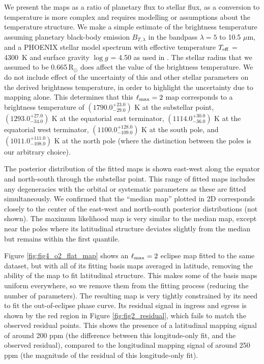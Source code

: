 \documentclass[twocolumn]{aastex631}
\begin{document}
We present the maps as a ratio of planetary flux to stellar flux, as a conversion to temperature is more complex and requires modelling or assumptions about the temperature structure. We make a simple estimate of the brightness temperature assuming planetary black-body emission $B_{T,\lambda}$ in the bandpass $\lambda=5$ to 10.5 $\mu$m, and a PHOENIX \citep{allard1995, hauschildt1999, husser2013} stellar model spectrum with effective temperature $T_{\rm eff}$ = 4300~K and surface gravity $\log g$ = 4.50 as used in \citet{bell2023wasp43b}. The stellar radius that we assumed to be 0.665\,R$_{\odot}$ does affect the value of the brightness temperature. We do not include effect of the uncertainty of this and other stellar parameters on the derived brightness temperature, in order to highlight the uncertainty due to mapping alone. This determines that this $\ell_{\rm max}=2$ map corresponds to a brightness temperature of $( 1790.0 ^{+ 23.0 } _{- 29.0 }) $ K at the substellar point, $( 1293.0 ^{+ 27.0 } _{- 34.0 }) $ K at the equatorial east terminator, $( 1114.0 ^{+ 30.0 } _{- 36.0 }) $ K at the equatorial west terminator, $( 1100.0 ^{+ 128.0 } _{- 109.0 }) $ K at the south pole, and $( 1011.0 ^{+ 111.0 } _{- 108.0 }) $ K at the north pole (where the distinction between the poles is our arbitrary choice).

The posterior distribution of the fitted maps is shown east-west along the equator and north-south through the substellar point. This range of fitted maps includes any degeneracies with the orbital or systematic parameters as these are fitted simultaneously. We confirmed that the ``median map'' plotted in 2D corresponds closely to the center of the east-west and north-south posterior distributions (not shown). The maximum likelihood map is very similar to the median map, except near the poles where its latitudinal structure deviates slightly from the median but remains within the first quantile.

Figure \ref{fig:fig4_o2_flat_map} shows an $\ell_{\rm max}=2$ eclipse map fitted to the same dataset, but with all of its fitting basis maps averaged in latitude, removing the ability of the map to fit latitudinal structure. This makes some of the basis maps uniform everywhere, so we remove them from the fitting process (reducing the number of parameters). The resulting map is very tightly constrained by its need to fit the out-of-eclipse phase curve. Its residual signal in ingress and egress is shown by the red region in Figure \ref{fig:fig2_residual}, which fails to match the observed residual points. This shows the presence of a latitudinal mapping signal of around 200 ppm (the difference between this longitude-only fit, and the observed residual), compared to the longitudinal mapping signal of around 250 ppm (the magnitude of the residual of this longitude-only fit).
\end{document}
